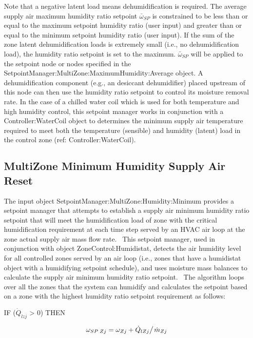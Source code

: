 Note that a negative latent load means dehumidification is required. The average supply air maximum humidity ratio setpoint \({\bar \omega_{SP}}\) is constrained to be less than or equal to the maximum setpoint humidity ratio (user input) and greater than or equal to the minimum setpoint humidity ratio (user input). If the sum of the zone latent dehumidification loads is extremely small (i.e., no dehumidification load), the humidity ratio setpoint is set to the maximum. \({\bar \omega_{SP}}\) will be applied to the setpoint node or nodes specified in the SetpointManager:MultiZone:MaximumHumidity:Average object. A dehumidification component (e.g., an desiccant dehumidifier) placed upstream of this node can then use the humidity ratio setpoint to control its moisture removal rate. In the case of a chilled water coil which is used for both temperature and high humidity control, this setpoint manager works in conjunction with a Controller:WaterCoil object to determines the minimum supply air temperature required to meet both the temperature (sensible) and humidity (latent) load in the control zone (ref: Controller:WaterCoil).

\subsection{MultiZone Minimum Humidity Supply Air Reset}\label{multizone-minimum-humidity-supply-air-reset}

The input object SetpointManager:MultiZone:Humidity:Minimum provides a setpoint manager that attempts to establish a supply air minimum humidity ratio setpoint that will meet the humidification load of zone with the critical humidification requirement at each time step served by an HVAC air loop at the zone actual supply air mass flow rate.~ This setpoint manager, used in conjunction with object ZoneControl:Humidistat, detects the air humidity level for all controlled zones served by an air loop (i.e., zones that have a humidistat object with a humidifying setpoint schedule), and uses moisture mass balances to calculate the supply air minimum humidity ratio setpoint.~ The algorithm loops over all the zones that the system can humidify and calculates the setpoint based on a zone with the highest humidity ratio setpoint requirement as follows:

IF (\({\dot Q_{lzj}}\) \textgreater{} 0) THEN

\begin{equation}
{\omega_{SP\;Zj}} = {\omega_{Zj}} + {{{{\dot Q}_{lZj}}} \mathord{\left/ {\vphantom {{{{\dot Q}_{lZj}}} {{{\dot m}_{Zj}}}}} \right. } {{{\dot m}_{Zj}}}}
\end{equation}

